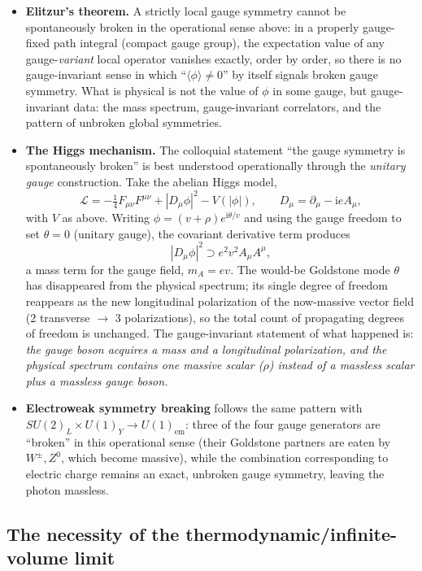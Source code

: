 \documentclass[11pt]{article}
\theoremstyle{definition}
\theoremstyle{remark}
\newcommand{\ii}{\mathrm{i}}
\newcommand{\Lag}{\mathcal{L}}
\begin{document}
\begin{itemize}
\item \textbf{Elitzur's theorem.} A strictly local gauge symmetry cannot be spontaneously broken in the operational sense above: in a properly gauge-fixed path integral (compact gauge group), the expectation value of any gauge-\emph{variant} local operator vanishes exactly, order by order, so there is no gauge-invariant sense in which ``$\langle\phi\rangle\neq0$'' by itself signals broken gauge symmetry. What is physical is not the value of $\phi$ in some gauge, but gauge-invariant data: the mass spectrum, gauge-invariant correlators, and the pattern of unbroken global symmetries.
\item \textbf{The Higgs mechanism.} The colloquial statement ``the gauge symmetry is spontaneously broken'' is best understood operationally through the \emph{unitary gauge} construction. Take the abelian Higgs model,
\[
\Lag = -\tfrac14 F_{\mu\nu}F^{\mu\nu} + |D_\mu\phi|^2 - V(|\phi|), \qquad D_\mu = \partial_\mu - \ii e A_\mu ,
\]
with $V$ as above. Writing $\phi=(v+\rho)e^{\ii\theta/v}$ and using the gauge freedom to set $\theta=0$ (unitary gauge), the covariant derivative term produces
\[
|D_\mu\phi|^2 \supset e^2v^2 A_\mu A^\mu ,
\]
a mass term for the gauge field, $m_A = ev$. The would-be Goldstone mode $\theta$ has disappeared from the physical spectrum; its single degree of freedom reappears as the new longitudinal polarization of the now-massive vector field (2 transverse $\to$ 3 polarizations), so the total count of propagating degrees of freedom is unchanged. The gauge-invariant statement of what happened is: \emph{the gauge boson acquires a mass and a longitudinal polarization, and the physical spectrum contains one massive scalar ($\rho$) instead of a massless scalar plus a massless gauge boson.}
\item \textbf{Electroweak symmetry breaking} follows the same pattern with $SU(2)_L\times U(1)_Y \to U(1)_{\text{em}}$: three of the four gauge generators are ``broken'' in this operational sense (their Goldstone partners are eaten by $W^\pm,Z^0$, which become massive), while the combination corresponding to electric charge remains an exact, unbroken gauge symmetry, leaving the photon massless.
\end{itemize}

\subsection{The necessity of the thermodynamic/infinite-volume limit}
\end{document}

